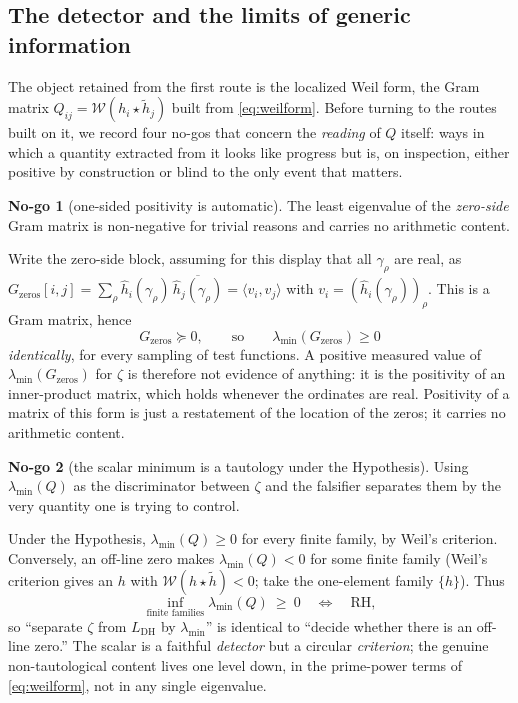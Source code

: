 \documentclass[11pt]{amsart}
\theoremstyle{definition}
\theoremstyle{remark}
\theoremstyle{definition}
\newtheorem{nogo}{No-go}[section]
\newcommand{\RH}{\mathrm{RH}}
\newcommand{\cW}{\mathcal{W}}
\begin{document}
\subsection{The detector and the limits of generic information}\label{sec:nogo-detector}

The object retained from the first route is the localized Weil form, the Gram matrix
$Q_{ij}=\cW(h_i\star\tilde h_j)$ built from \eqref{eq:weilform}. Before turning to the routes built on it, we record four no-gos
that concern the \emph{reading} of $Q$ itself: ways in which a quantity extracted from it looks like
progress but is, on inspection, either positive by construction or blind to the only event that matters.

\begin{nogo}[one-sided positivity is automatic]\label{ng:psd}
The least eigenvalue of the \emph{zero-side} Gram matrix is non-negative for trivial reasons and carries no
arithmetic content.
\end{nogo}
\noindent Write the zero-side block, assuming for this display that all $\gamma_\rho$ are real, as $G_{\mathrm{zeros}}[i,j]=\sum_\rho\widehat h_i(\gamma_\rho)\,
\overline{\widehat h_j(\gamma_\rho)}=\langle v_i,v_j\rangle$ with $v_i=(\widehat h_i(\gamma_\rho))_\rho$.
This is a Gram matrix, hence
\[
   G_{\mathrm{zeros}}\succeq0,\qquad\text{so}\qquad \lambda_{\min}(G_{\mathrm{zeros}})\ge0
\]
\emph{identically}, for every sampling of test functions. A positive measured value of
$\lambda_{\min}(G_{\mathrm{zeros}})$ for $\zeta$ is therefore not evidence of anything: it is the
positivity of an inner-product matrix, which holds whenever the ordinates are real. Positivity of a matrix
of this form is just a restatement of the location of the zeros; it carries no arithmetic content.

\begin{nogo}[the scalar minimum is a tautology under the Hypothesis]\label{ng:tauto}
Using $\lambda_{\min}(Q)$ as the discriminator between $\zeta$ and the falsifier separates them by the very
quantity one is trying to control.
\end{nogo}
\noindent Under the Hypothesis, $\lambda_{\min}(Q)\ge0$ for every finite family, by Weil's criterion.
Conversely, an off-line zero makes $\lambda_{\min}(Q)<0$ for some finite family (Weil's criterion gives an
$h$ with $\cW(h\star\tilde h)<0$; take the one-element family $\{h\}$). Thus
\[
   \inf_{\text{finite families}}\lambda_{\min}(Q)\ \ge\ 0\quad\Longleftrightarrow\quad\RH,
\]
so ``separate $\zeta$ from $L_{\mathrm{DH}}$ by $\lambda_{\min}$'' is identical to ``decide whether there is
an off-line zero.'' The scalar is a faithful \emph{detector} but a circular \emph{criterion}; the genuine
non-tautological content lives one level down, in the prime-power terms of \eqref{eq:weilform},
not in any single eigenvalue.
\end{document}
